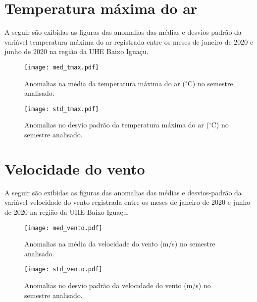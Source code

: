 \documentclass[a4paper,12pt]{article}
\begin{document}
        
        \newpage
        
        \section{Temperatura máxima do ar }
        \hspace{0.5cm} A seguir são exibidas as figuras das anomalias das médias e desvios-padrão da variável temperatura máxima do ar 
        registrada entre os meses de janeiro de 2020 e junho de 2020 na região da UHE Baixo Iguaçu.
        
        \begin{figure}[!htb]
        \centering
        \texttt{[image: med\_tmax.pdf]}
        \caption{Anomalias na média da temperatura máxima do ar ($^\circ$C) no semestre analisado.}
        \label{fig:figmed_tmax}
        \end{figure}
        
        \begin{figure}[!htb]
        \centering
        \texttt{[image: std\_tmax.pdf]}
        \caption{Anomalias no desvio padrão da temperatura máxima do ar ($^\circ$C) no semestre analisado.}
        \label{fig:figstd_tmax}
        \end{figure}  
        
        
        \newpage
        
        \section{Velocidade do vento }
        \hspace{0.5cm} A seguir são exibidas as figuras das anomalias das médias e desvios-padrão da variável velocidade do vento 
        registrada entre os meses de janeiro de 2020 e junho de 2020 na região da UHE Baixo Iguaçu.
        
        \begin{figure}[!htb]
        \centering
        \texttt{[image: med\_vento.pdf]}
        \caption{Anomalias na média da velocidade do vento (m/s) no semestre analisado.}
        \label{fig:figmed_vento}
        \end{figure}
        
        \begin{figure}[!htb]
        \centering
        \texttt{[image: std\_vento.pdf]}
        \caption{Anomalias no desvio padrão da velocidade do vento (m/s) no semestre analisado.}
        \label{fig:figstd_vento}
        \end{figure}  
        
\end{document}
